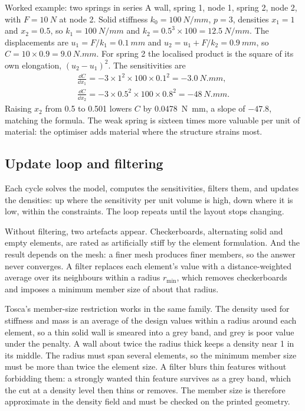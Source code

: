 \begin{theorybox}{Worked example: two springs in series}
A wall, spring 1, node 1, spring 2, node 2, with $F = \SI{10}{N}$ at node 2. Solid stiffness $k_0 = \SI{100}{N/mm}$, $p = 3$, densities $x_1 = 1$ and $x_2 = 0.5$, so $k_1 = \SI{100}{N/mm}$ and $k_2 = 0.5^3 \times 100 = \SI{12.5}{N/mm}$. The displacements are $u_1 = F/k_1 = \SI{0.1}{mm}$ and $u_2 = u_1 + F/k_2 = \SI{0.9}{mm}$, so $C = 10 \times 0.9 = \SI{9.0}{N.mm}$. For spring 2 the localised product is the square of its own elongation, $(u_2 - u_1)^2$. The sensitivities are
\begin{gather*}
\frac{\dd C}{\dd x_1} = -3 \times 1^2 \times 100 \times 0.1^2 = \SI{-3.0}{N.mm},\\
\frac{\dd C}{\dd x_2} = -3 \times 0.5^2 \times 100 \times 0.8^2 = \SI{-48}{N.mm}.
\end{gather*}
Raising $x_2$ from 0.5 to 0.501 lowers $C$ by \SI{0.0478}{N.mm}, a slope of $-47.8$, matching the formula. The weak spring is sixteen times more valuable per unit of material: the optimiser adds material where the structure strains most.
\end{theorybox}

\subsection{Update loop and filtering}

Each cycle solves the model, computes the sensitivities, filters them, and updates the densities: up where the sensitivity per unit volume is high, down where it is low, within the constraints. The loop repeats until the layout stops changing.

Without filtering, two artefacts appear. Checkerboards, alternating solid and empty elements, are rated as artificially stiff by the element formulation. And the result depends on the mesh: a finer mesh produces finer members, so the answer never converges. A filter replaces each element's value with a distance-weighted average over its neighbours within a radius $r_\text{min}$, which removes checkerboards and imposes a minimum member size of about that radius.

Tosca's member-size restriction works in the same family. The density used for stiffness and mass is an average of the design values within a radius around each element, so a thin solid wall is smeared into a grey band, and grey is poor value under the penalty. A wall about twice the radius thick keeps a density near 1 in its middle. The radius must span several elements, so the minimum member size must be more than twice the element size. A filter blurs thin features without forbidding them: a strongly wanted thin feature survives as a grey band, which the cut at a density level then thins or removes. The member size is therefore approximate in the density field and must be checked on the printed geometry.

